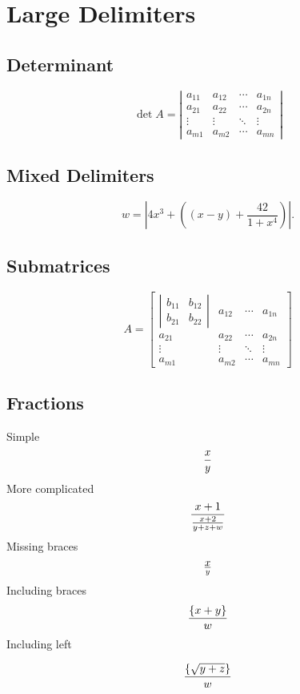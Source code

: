 \documentclass{article}
\begin{document}
\section{Large Delimiters}

\subsection{Determinant}

\[
\det A = \left| \begin{array}{cccc}
a_{11} & a_{12} & \cdots & a_{1n}\\
a_{21} & a_{22} & \cdots & a_{2n}\\
\vdots & \vdots & \ddots & \vdots\\
a_{m1} & a_{m2} & \cdots & a_{mn}
\end{array} \right|
\]

\subsection{Mixed Delimiters}
\[
w =  \left| 4 x^3 + \left( (x-y) + \frac{42}{1+x^4} \right) \right|.
\]

\subsection{Submatrices}
\[
A = \left[ \begin{array}{cccc}
\left|\begin{array}{cc}
b_{11}&b_{12}\\
b_{21}&b_{22}
\end{array}\right|
 & a_{12} & \cdots & a_{1n}\\
a_{21} & a_{22} & \cdots & a_{2n}\\
\vdots & \vdots & \ddots & \vdots\\
a_{m1} & a_{m2} & \cdots & a_{mn}
\end{array} \right]
\]

\subsection{Fractions}
Simple
\[
{x \over y}
\]
More complicated
\[
{x+1 \over {x+2 \over y+z +w}}
\]
Missing braces
\[
x \over y
\]
Including braces
\[
{\{ x+y \} \over w}
\]
Including left

\[
{\left\{\sqrt{y+z}\right\}\over w}
\]
\end{document}
